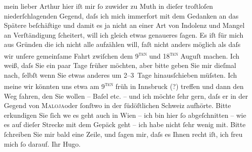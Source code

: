 \pstart{}mein lieber Arthur\pend\vspace{0.5em}
\pstart
           hier iſt mir ſo zuwider zu Muth in dieſer troſtloſen niederſchlagenden Gegend, daſs
               ich mich immerfort mit dem Gedanken an das Spätere beſchäftige und damit es ja nicht
               an einer Art von Indolenz und Mangel an Verſtändigung ſcheitert, will ich gleich
               etwas genaueres ſagen. Es iſt {\pb}für
               mich aus Gründen die ich nicht alle aufzählen will, faſt nicht anders möglich als
               daſs wir unſere gemeinſame Fahrt zwiſchen dem 9\textsc{\textsuperscript{ten}} und 18\textsc{\textsuperscript{ten}} Auguſt machen. Ich weiß, daſs Sie ein paar Tage früher möchten, aber
               bitte geben Sie mir dieſmal {\pb}nach,
               ſelbſt wenn Sie etwas anderes um 2–3 Tage hinausſchieben müſsten. Ich meine wir
               könnten uns etwa am 9\textsc{\textsuperscript{ten}} früh in Innsbruck (?) treffen und dann den
               Weg fahren, den Sie wollen – Baſel etc. – und ich
               möchte ſehr gern, daſs er in der Gegend von \textsc{Maloja}oder ſonſtwo in der ſüdöſtlichen
                  Schweiz aufhörte. Bitte erkundigen Sie ſich
                  we{\geminationn} es geht auch in Wien – ich bin hier ſo abgeſchnitten – wie es auf dieſer Strecke mit dem
               Gepäck geht – ich habe nicht ſehr wenig mit. Bitte ſchreiben Sie mir bald eine Zeile,
               und ſagen mir, daſs es Ihnen recht iſt, ich freu mich ſo darauf. Ihr
                  \spacefill\mbox{Hugo.}\pend
           \endnumbering{}  
      